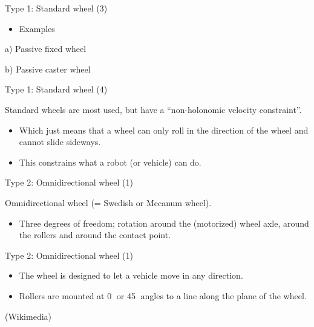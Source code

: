 \documentclass[compress]{beamer}
\begin{document}
\begin{frame}{Type 1: Standard wheel (3)}

\begin{itemize}
    \item Examples
\end{itemize}

a) Passive fixed wheel

b) Passive caster wheel

\end{frame}

\begin{frame}{Type 1: Standard wheel (4)}

Standard wheels are most used, but have a ``non-holonomic velocity
constraint''.

\begin{itemize}
    \item Which just means that a wheel can only roll in the direction of the
  wheel and cannot slide sideways.
    \item This constrains what a robot (or vehicle) can do.
\end{itemize}

\end{frame}

\begin{frame}{Type 2: Omnidirectional wheel (1)}

Omnidirectional wheel (= Swedish or Mecanum wheel).

\begin{itemize}
    \item Three degrees of freedom; rotation around the (motorized) wheel axle,
  around the rollers and around the contact point.
\end{itemize}

\end{frame}

\begin{frame}{Type 2: Omnidirectional wheel (1)}

\begin{itemize}
    \item The wheel is designed to let a vehicle move in any direction.
    \item Rollers are mounted at 0 or 45 angles to a line along the plane of
  the wheel.
\end{itemize}

(Wikimedia)

\end{frame}
\end{document}
